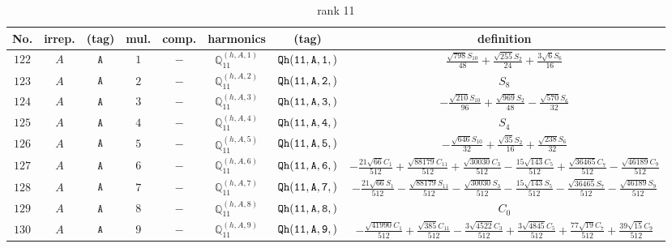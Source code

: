 \documentclass[fleqn,8pt]{jsarticle}
\begin{document}
\begin{table}[ht!]
\begin{center}
\caption{rank 11}
\renewcommand{\arraystretch}{1.3}
\begin{tabular}{cccccccc} \hline \hline
No. & irrep. & (tag) & mul. & comp. & harmonics & (tag) & definition \\ \hline
$ 122 $ & $ A $ & $ {\tt A} $ & $ 1 $ & $ - $ & $ \mathbb{Q}_{11}^{(h,A,1)} $ & $ {\tt Qh(11,A,1,)} $ & $ \frac{\sqrt{798} S_{10}}{48} + \frac{\sqrt{255} S_{2}}{24} + \frac{3 \sqrt{6} S_{6}}{16} $ \\
$ 123 $ & $ A $ & $ {\tt A} $ & $ 2 $ & $ - $ & $ \mathbb{Q}_{11}^{(h,A,2)} $ & $ {\tt Qh(11,A,2,)} $ & $ S_{8} $ \\
$ 124 $ & $ A $ & $ {\tt A} $ & $ 3 $ & $ - $ & $ \mathbb{Q}_{11}^{(h,A,3)} $ & $ {\tt Qh(11,A,3,)} $ & $ - \frac{\sqrt{210} S_{10}}{96} + \frac{\sqrt{969} S_{2}}{48} - \frac{\sqrt{570} S_{6}}{32} $ \\
$ 125 $ & $ A $ & $ {\tt A} $ & $ 4 $ & $ - $ & $ \mathbb{Q}_{11}^{(h,A,4)} $ & $ {\tt Qh(11,A,4,)} $ & $ S_{4} $ \\
$ 126 $ & $ A $ & $ {\tt A} $ & $ 5 $ & $ - $ & $ \mathbb{Q}_{11}^{(h,A,5)} $ & $ {\tt Qh(11,A,5,)} $ & $ - \frac{\sqrt{646} S_{10}}{32} + \frac{\sqrt{35} S_{2}}{16} + \frac{\sqrt{238} S_{6}}{32} $ \\
$ 127 $ & $ A $ & $ {\tt A} $ & $ 6 $ & $ - $ & $ \mathbb{Q}_{11}^{(h,A,6)} $ & $ {\tt Qh(11,A,6,)} $ & $ - \frac{21 \sqrt{66} C_{1}}{512} + \frac{\sqrt{88179} C_{11}}{512} + \frac{\sqrt{30030} C_{3}}{512} - \frac{15 \sqrt{143} C_{5}}{512} + \frac{\sqrt{36465} C_{7}}{512} - \frac{\sqrt{46189} C_{9}}{512} $ \\
$ 128 $ & $ A $ & $ {\tt A} $ & $ 7 $ & $ - $ & $ \mathbb{Q}_{11}^{(h,A,7)} $ & $ {\tt Qh(11,A,7,)} $ & $ - \frac{21 \sqrt{66} S_{1}}{512} - \frac{\sqrt{88179} S_{11}}{512} - \frac{\sqrt{30030} S_{3}}{512} - \frac{15 \sqrt{143} S_{5}}{512} - \frac{\sqrt{36465} S_{7}}{512} - \frac{\sqrt{46189} S_{9}}{512} $ \\
$ 129 $ & $ A $ & $ {\tt A} $ & $ 8 $ & $ - $ & $ \mathbb{Q}_{11}^{(h,A,8)} $ & $ {\tt Qh(11,A,8,)} $ & $ C_{0} $ \\
$ 130 $ & $ A $ & $ {\tt A} $ & $ 9 $ & $ - $ & $ \mathbb{Q}_{11}^{(h,A,9)} $ & $ {\tt Qh(11,A,9,)} $ & $ - \frac{\sqrt{41990} C_{1}}{512} + \frac{\sqrt{385} C_{11}}{512} - \frac{3 \sqrt{4522} C_{3}}{512} + \frac{3 \sqrt{4845} C_{5}}{512} + \frac{77 \sqrt{19} C_{7}}{512} + \frac{39 \sqrt{15} C_{9}}{512} $ \\

\end{tabular}
\end{center}
\end{table}
\end{document}
